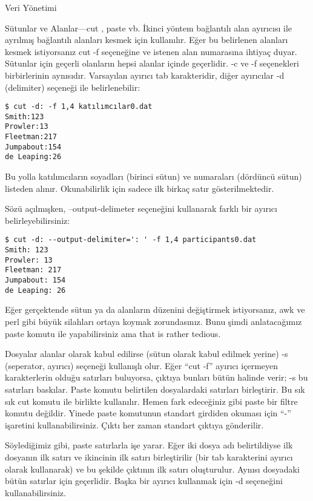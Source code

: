 \begin{section}{Veri Yönetimi}
\begin{subsection}{Sütunlar ve Alanlar—cut , paste vb.}
İkinci yöntem bağlantılı alan ayırıcısı ile ayrılmış bağlantılı alanları kesmek için kullanılır. Eğer bu belirlenen alanları kesmek istiyorsanız cut -f seçeneğine ve istenen alan numarasına ihtiyaç duyar. Sütunlar için geçerli olanların hepsi alanlar içinde geçerlidir. -c ve -f  seçenekleri birbirlerinin aynısıdır.
Varsayılan ayırıcı tab karakteridir, diğer ayırıcılar -d (delimiter) seçeneği ile belirlenebilir:
\footnotesize
\begin{verbatim}
$ cut -d: -f 1,4 katılımcılar0.dat 
Smith:123 
Prowler:13 
Fleetman:217 
Jumpabout:154 
de Leaping:26
\end{verbatim}
\normalsize

Bu yolla katılımcıların soyadları (birinci sütun) ve numaraları (dördüncü sütun) listeden alınır. Okunabilirlik için sadece ilk birkaç satır gösterilmektedir.

Sözü açılmışken, --output-delimeter seçeneğini kullanarak farklı bir ayırıcı belirleyebilirsiniz:
\footnotesize
\begin{verbatim}
$ cut -d: --output-delimiter=': ' -f 1,4 participants0.dat
Smith: 123
Prowler: 13
Fleetman: 217
Jumpabout: 154
de Leaping: 26
\end{verbatim}
\normalsize

Eğer gerçektende sütun ya da alanların düzenini değiştirmek istiyorsanız, awk ve perl gibi büyük silahları ortaya koymak zorundasınız. Bunu şimdi anlatacağımız paste komutu ile yapabilirsiniz ama that is rather tedious. 

Dosyalar alanlar olarak kabul edilirse (sütun olarak kabul edilmek yerine) -s (seperator, ayırıcı) seçeneği kullanışlı olur.  Eğer “cut -f” ayırıcı içermeyen karakterlerin olduğu satırları buluyorsa, çıktıya bunları bütün halinde verir; -s bu satırları baskılar. Paste komutu belirtilen dosyalardaki satırları birleştirir. Bu sık sık cut komutu ile birlikte kullanılır. Hemen fark edeceğiniz gibi paste bir filtre komutu değildir. Yinede paste komutunun standart girdiden okuması için “-” işaretini kullanabilirsiniz. Çıktı her zaman standart çıktıya gönderilir. 

Söylediğimiz gibi, paste satırlarla işe yarar. Eğer iki dosya adı belirtildiyse ilk dosyanın ilk satırı ve ikincinin ilk satırı birleştirilir (bir tab karakterini ayırıcı olarak kullanarak) ve bu şekilde çıktının ilk satırı oluşturulur. Aynısı dosyadaki bütün satırlar için geçerlidir. Başka bir ayırıcı kullanmak için -d seçeneğini kullanabilirsiniz.


\end{subsection}
\end{section}
